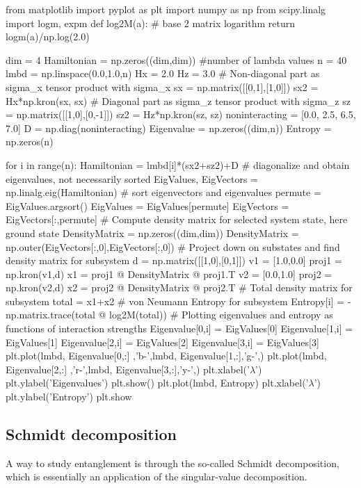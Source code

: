 \documentclass[%
oneside,                 %
final,                   %
10pt]{article}
\begin{document}
\bpycod
from  matplotlib import pyplot as plt
import numpy as np
from scipy.linalg import logm, expm
def log2M(a): # base 2 matrix logarithm
    return logm(a)/np.log(2.0)

dim = 4
Hamiltonian = np.zeros((dim,dim))
#number of lambda values
n = 40
lmbd = np.linspace(0.0,1.0,n)
Hx = 2.0
Hz = 3.0
# Non-diagonal part as sigma_x tensor product with sigma_x
sx = np.matrix([[0,1],[1,0]])
sx2 = Hx*np.kron(sx, sx)
# Diagonal part as sigma_z tensor product with sigma_z
sz = np.matrix([[1,0],[0,-1]])
sz2 = Hz*np.kron(sz, sz)
noninteracting = [0.0, 2.5, 6.5, 7.0]
D = np.diag(noninteracting)
Eigenvalue = np.zeros((dim,n))
Entropy = np.zeros(n)

for i in range(n): 
    Hamiltonian = lmbd[i]*(sx2+sz2)+D
    # diagonalize and obtain eigenvalues, not necessarily sorted
    EigValues, EigVectors = np.linalg.eig(Hamiltonian)
    # sort eigenvectors and eigenvalues
    permute = EigValues.argsort()
    EigValues = EigValues[permute]
    EigVectors = EigVectors[:,permute]
    # Compute density matrix for selected system state, here ground state
    DensityMatrix = np.zeros((dim,dim))
    DensityMatrix = np.outer(EigVectors[:,0],EigVectors[:,0])
    # Project down on substates and find density matrix for subsystem
    d = np.matrix([[1,0],[0,1]])
    v1 = [1.0,0.0]
    proj1 = np.kron(v1,d)
    x1 = proj1 @ DensityMatrix @ proj1.T
    v2 = [0.0,1.0]
    proj2 = np.kron(v2,d)
    x2 = proj2 @ DensityMatrix @ proj2.T
    # Total density matrix for subsystem
    total = x1+x2
    # von Neumann Entropy for subsystem 
    Entropy[i] = -np.matrix.trace(total @ log2M(total))
    # Plotting eigenvalues and entropy as functions of interaction strengths
    Eigenvalue[0,i] = EigValues[0]
    Eigenvalue[1,i] = EigValues[1]
    Eigenvalue[2,i] = EigValues[2]
    Eigenvalue[3,i] = EigValues[3]
plt.plot(lmbd, Eigenvalue[0,:] ,'b-',lmbd, Eigenvalue[1,:],'g-',)
plt.plot(lmbd, Eigenvalue[2,:] ,'r-',lmbd, Eigenvalue[3,:],'y-',)
plt.xlabel('$\lambda$')
plt.ylabel('Eigenvalues')
plt.show()
plt.plot(lmbd, Entropy)
plt.xlabel('$\lambda$')
plt.ylabel('Entropy')          
plt.show

\epycod


\subsection{Schmidt decomposition}

A way to study entanglement is through the so-called Schmidt decomposition,
which is essentially an application of the
singular-value decomposition.
\end{document}
